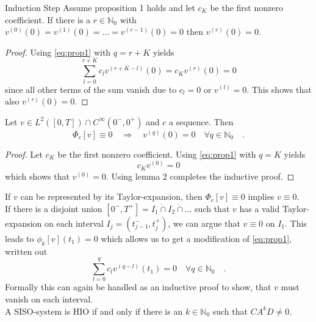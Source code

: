 \begin{lemma}{Induction Step}{}
	Assume proposition 1 holds and let $c_K$ be the first nonzero coefficient. 
	If there is a $r\in\mathbb{N}_0$ with $v^{(0)}(0)=
	v^{(1)}(0)=\ldots= v^{(r-1)}(0)=0$ then $v^{(r)}(0)=0$. 
\end{lemma}
\begin{proof}
	Using \eqref{eq:prop1} with $q = r+K$ yields 
	\begin{equation}
	\sum\limits_{l=0}^{r+K} c_l v^{(r+K-l)}(0) = c_K v^{(r)}(0) = 0
	\end{equation}
	since all other terms of the sum vanish due to $c_l=0$ or $v^{(l)}=0$. This shows 
	that also $v^{(r)}(0)=0$.
\end{proof}

\begin{theorem}{}{}
	Let $v\in L^2([0,T])\cap C^\infty(0^-,0^+)$ and $c$ a sequence. Then
	\begin{equation}
	\Phi_c[v] \equiv 0\quad  \Rightarrow\quad v^{(q)}(0) = 0
	 \quad \forall q\in\mathbb{N}_0 \quad .
	\end{equation}
\end{theorem}
\begin{proof}
	Let $c_K$ be the first nonzero coefficient. Using \eqref{eq:prop1} with $q=K$ yields 
	\begin{equation}
	c_K v^{(0)} = 0 
	\end{equation}
	which shows that $v^{(0)}=0$. Using lemma 2 completes the inductive proof.
\end{proof}

\begin{corollary}{}{}
	If $v$ can be represented by its Taylor-expansion, then $\Phi_c[v]\equiv 0$ implies 
	$v\equiv 0$.\\
	
	If there is a disjoint union $[0^-,T^+] = I_1\dot{\cap} I_2 \dot{\cap}\ldots$ such 
	that 
	$v$ has a valid Taylor-expansion on each interval $I_j=(t_{j-1}^-,t_j^+)$, we can argue 
	that $v\equiv 0$ on $I_1$. This leads to $\phi_k[v](t_1)=0$ which allows us to get 
	a modification of \eqref{eq:prop1}, written out
	\begin{equation}
	\sum\limits_{l=0}^q c_l v^{(q-l)}(t_1) = 0 \quad \forall q \in \mathbb{N}_0 \quad .
	\end{equation}
	Formally this can again be handled as an inductive proof to show, that $v$ must 
	vanish on each interval.\\
	
	A SISO-system is HIO if and only if there is an $k\in\mathbb{N}_0$ such that 
	$CA^kD \neq 0$. 
\end{corollary}


